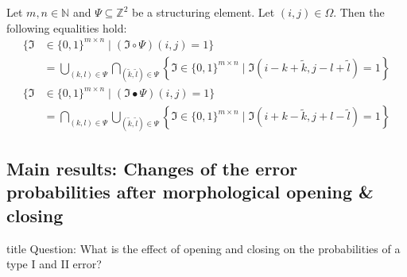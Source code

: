 \documentclass[presentation]{beamer}
\begin{document}
\begin{frame}
	\begin{lemma}
		Let $m, n \in \mathbb{N}$ and $\Psi \subseteq \mathbb{Z}^2$ be a structuring element. Let $(i, j) \in \Omega$. Then the following equalities hold:
		\begin{equation*}
			\begin{aligned}
				\big\{ \mathfrak{I} &\in \{ 0, 1 \}^{m \times n} \mid (\mathfrak{I} \circ \Psi)(i, j) = 1 \big\} \\
				&= \bigcup_{(k, l) \in \Psi} \bigcap_{(\tilde{k}, \tilde{l}) \in \Psi} \left\{ \mathfrak{I} \in \{ 0, 1 \}^{m \times n} \mid \mathfrak{I}(i - k + \tilde{k}, j - l + \tilde{l}) = 1 \right\}
			\end{aligned}
		\end{equation*}
		\begin{equation*}
			\begin{aligned}
				\big\{ \mathfrak{I} &\in \{ 0, 1 \}^{m \times n} \mid (\mathfrak{I} \bullet \Psi)(i, j) = 1 \big\} \\
				&= \bigcap_{(k, l) \in \Psi} \bigcup_{(\tilde{k}, \tilde{l}) \in \Psi} \left\{ \mathfrak{I} \in \{ 0, 1 \}^{m \times n} \mid \mathfrak{I}(i + k - \tilde{k}, j + l - \tilde{l}) = 1 \right\}
			\end{aligned}
		\end{equation*}
	\end{lemma}
\end{frame}

\subsection{Main results: Changes of the error probabilities after morphological opening \& closing}

\begin{frame}
	\begin{beamercolorbox}[sep=8pt,center,shadow=true,rounded=true]{title}
		Question: What is the effect of opening and closing on the probabilities of a type I and II error?
	\end{beamercolorbox}
\end{frame}
\end{document}
